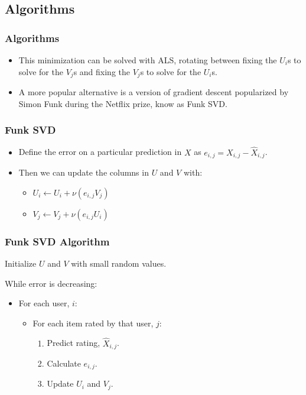 \documentclass{beamer}
\begin{document}
\subsection{Algorithms}
\begin{frame}
  \frametitle{Algorithms}
  \begin{itemize}
    \item This minimization can be solved with ALS, rotating between fixing the $U_i$s to solve for the $V_j$s and fixing the $V_j$s to solve for the $U_i$s. \vspace{4mm}
    \item A more popular alternative is a version of gradient descent popularized by Simon Funk during the Netflix prize, know as Funk SVD.
  \end{itemize}
\end{frame}

\begin{frame}
  \frametitle{Funk SVD}
  \begin{itemize}
    \item Define the error on a particular prediction in $X$ as $e_{i,j} = X_{i,j} - \hat{X}_{i,j}$. \vspace{4mm}
    \item Then we can update the columns in $U$ and $V$ with:
    \begin{itemize}
      \item $U_i \leftarrow U_i + \nu(e_{i,j}V_j)$
      \item $V_j \leftarrow V_j + \nu(e_{i,j}U_i)$
    \end{itemize}
  \end{itemize}
\end{frame}

\begin{frame}
  \frametitle{Funk SVD Algorithm}
  Initialize $U$ and $V$ with small random values. \vspace{1mm}

  While error is decreasing:
  \begin{itemize}
    \item For each user, $i$:
    \begin{itemize}
      \item For each item rated by that user, $j$:
      \begin{enumerate}
        \item Predict rating, $\hat{X}_{i,j}$.
        \item Calculate $e_{i,j}$.
        \item Update $U_i$ and $V_j$.
      \end{enumerate}
    \end{itemize}
  \end{itemize}
\end{frame}
\end{document}
